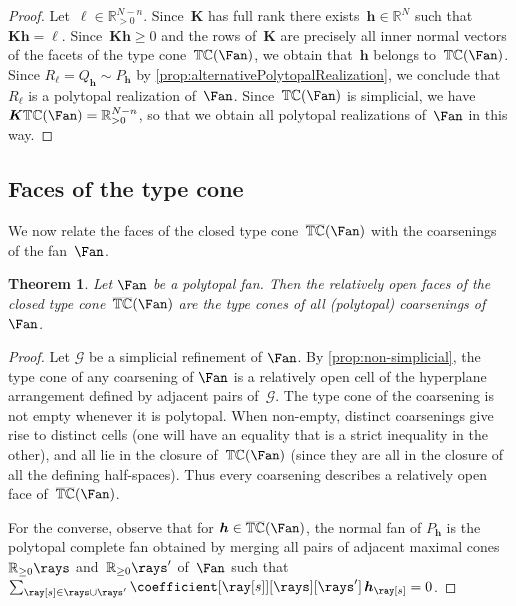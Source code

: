 \documentclass{amsart}
\newtheorem{theorem}{Theorem}[section]
\theoremstyle{definition}
\newcommand{\R}{\mathbb{R}} %
\newcommand{\cal}[1]{{\mathcal{#1}}} %
\renewcommand{\b}[1]{{\boldsymbol{#1}}} %
\newcommand{\typeCone}{\mathbb{TC}} %
\newcommand{\ctypeCone}{\smash{\overline{\mathbb{TC}}}} %
\begin{document}
\begin{proof}
Let~$\b{\ell} \in \R_{>0}^{N-n}$.
Since~$\b{K}$ has full rank there exists~$\b{h} \in \R^N$ such that~$\b{K}\b{h} = \b{\ell}$.
Since~$\b{K}\b{h} \ge 0$ and the rows of~$\b{K}$ are precisely all inner normal vectors of the facets of the type cone~$\typeCone(\Fan)$, we obtain that~$\b{h}$ belongs to~$\typeCone(\Fan)$.
Since $R_\b{\ell} = Q_\b{h} \sim P_\b{h}$ by \cref{prop:alternativePolytopalRealization}, we conclude that~$R_\b{\ell}$ is a polytopal realization of~$\Fan$.
Since~$\typeCone(\Fan)$ is simplicial, we have~$\b{K}\typeCone(\Fan) = \R_{>0}^{N-n}$, so that we obtain all polytopal realizations of~$\Fan$ in this way.
\end{proof}


\subsection{Faces of the type cone}
\label{subsec:facesTypeCone}

We now relate the faces of the closed type cone~$\ctypeCone(\Fan)$ with the coarsenings of the fan~$\Fan$.

\begin{theorem}
Let $\Fan$ be a polytopal fan. Then the relatively open faces of the closed type cone~$\ctypeCone(\Fan)$ are the type cones of all (polytopal) coarsenings of~$\Fan$. 
\end{theorem}

\begin{proof}
Let $\cal{G}$ be a simplicial refinement of $\Fan$. By \cref{prop:non-simplicial}, the type cone of any coarsening of $\Fan$ is a relatively open cell of the hyperplane arrangement defined by adjacent pairs of~$\cal{G}$. The type cone of the coarsening is not empty whenever it is polytopal. When non-empty, distinct coarsenings give rise to distinct cells (one will have an equality that is a strict inequality in the other), and all lie in the closure of~$\typeCone(\Fan)$ (since they are all in the closure of all the defining half-spaces).
Thus every coarsening describes a relatively open face of~$\ctypeCone(\Fan)$.
 
For the converse, observe that for $\b{h}\in\ctypeCone(\Fan)$, the normal fan of $P_{\b{h}}$ is the polytopal complete fan obtained by merging all pairs of adjacent maximal cones~$\R_{\ge0}\rays$ and~$\R_{\ge0}\rays'$ of~$\Fan$ such that $\sum_{\ray[s] \in \rays \cup \rays'} \coefficient[{\ray[s]}][\rays][\rays'] \, \b{h}_{\ray[s]} = 0$.
\end{proof}
\end{document}
